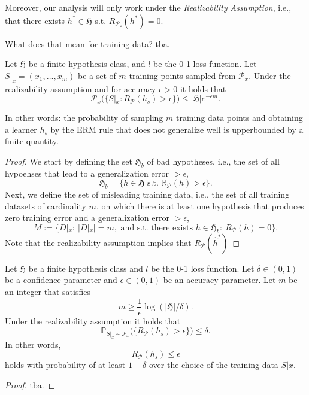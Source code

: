 Moreover, our analysis will only work under the  
 \emph{Realizability Assumption}, i.e., that
there exists $h^* \in \mathfrak{H}$ s.t. $R_{\mathcal{P}_z}(h^*) = 0$.

What does that mean for training data? tba.
    \begin{lemma}
		Let $\mathfrak{H}$ be a finite hypothesis class, and $l$ be the 0-1 loss
		function. Let $S|_x = (x_1, \dots, x_m)$ be a set of $m$ training points
		sampled from $\mathcal{P}_x$. Under the realizability assumption and
		for accuracy $\epsilon >0$ it holds that 
		$$
		\mathcal{P}_x\bigl(\{S|_x: R_\mathcal{P}(h_s) > \epsilon\} \bigr) \leq |\mathfrak{H}| e ^{-\epsilon m}.
		$$
	\end{lemma}
	In other words: the probability of sampling $m$ training data points and
	obtaining a learner $h_s$ by the ERM rule that does not generalize well is
	upperbounded by a finite quantity.
\begin{proof}
    We start by defining the set $\mathfrak{H}_b$ of bad hypotheses, i.e., the
    set of all hypoehses that lead to a generalization error $> \epsilon$,
    $$
    \mathfrak{H}_b = \{h \in \mathfrak{H} \text{ s.t. } \mathbb{R}_\mathcal{P} (h) > \epsilon\}.
    $$
    Next, we define the set of misleading training data, i.e., the set of all
    training datasets of cardinality $m$, on which there is at least one
    hypothesis that produces zero training error and a generalization error $>
    \epsilon$,
    $$
    M:= \{D|_x: \ |D|_x|=m, \text{ and s.t. there exists }h  \in \mathfrak{H}_b : \ R_\mathcal{P}(h)=0 \}.
    $$
    Note that the realizability assumption implies that $R_\mathcal{P}(\hat{h}^*)$
\end{proof}
    \begin{coro}
		\label{Coro:finite_hypo}
		Let $\mathfrak{H}$ be a finite hypothesis class and $l$ be the 0-1 loss
		function. Let $\delta \in (0,1)$ be a confidence parameter and $\epsilon \in
		(0,1)$ be an accuracy parameter. Let $m$ be an integer that satisfies
		$$
		m \geq \frac{1}{\epsilon} \log(|\mathfrak{H}|/\delta).
		$$ 	
		Under the realizability assumption it holds that 
		$$
		\mathbb{P}_{S|_x \sim \mathcal{P}_x} \bigl( \{ R_\mathcal{P}(h_s) > \epsilon \}\bigr) \leq \delta.
		$$
		In other words, 
		$$
		R_\mathcal{P}(h_s) \leq \epsilon
		$$
		holds with probability of at least $1-\delta$ over the choice of the
		training data $S|x$.
	\end{coro}
    \begin{proof}
        tba.
    \end{proof}
